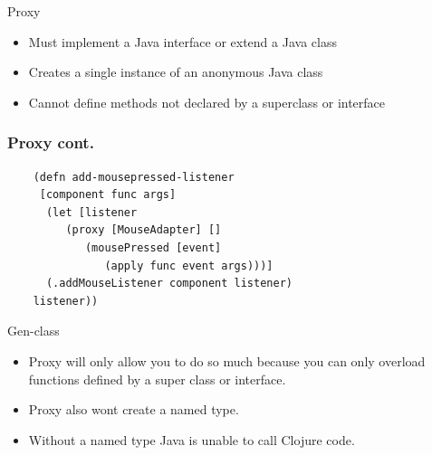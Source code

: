 \documentclass[xcolor=dvipsnames]{beamer}
\begin{document}

	
	\begin{frame}{Proxy}
	\begin{itemize}
	\item Must implement a Java interface or extend a Java class
	\item Creates a single instance of an anonymous Java class
	\item Cannot define methods not declared by a superclass or interface
	\end{itemize}
	\end{frame}	

	
	\begin{frame}[fragile]
	\frametitle{Proxy cont.}
	\begin{verbatim}
	(defn add-mousepressed-listener
     [component func args]
      (let [listener 
         (proxy [MouseAdapter] []
            (mousePressed [event] 
               (apply func event args)))]
      (.addMouseListener component listener)
    listener))
	\end{verbatim}
	\end{frame}
	
	\begin{frame}{Gen-class}
	\begin{itemize}	
	\item Proxy will only allow you to do so much because you can only overload functions defined by a super class or interface.
	\item Proxy also wont create a named type.
        \pause
	\item Without a named type Java is unable to call Clojure code. 
	\end{itemize}
	\end{frame}
	
\end{document}
